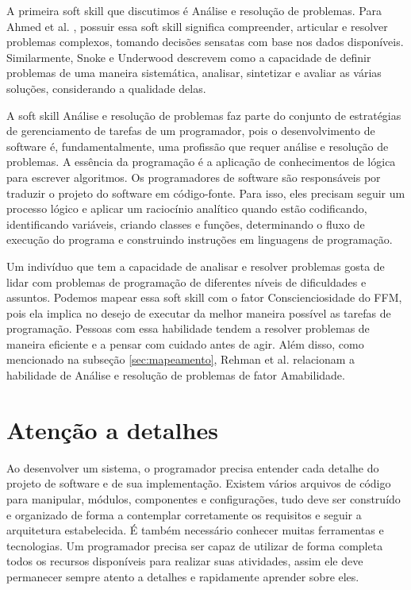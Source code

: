 A primeira soft skill que discutimos é Análise e resolução de problemas. Para Ahmed et al. \cite{ahmed:12}, possuir essa soft skill significa compreender, articular e resolver problemas complexos, tomando decisões sensatas com base nos dados disponíveis. Similarmente, Snoke e Underwood \cite{snoke:01} descrevem como a capacidade de definir problemas de uma maneira sistemática, analisar, sintetizar e avaliar as várias soluções, considerando a qualidade delas.

A soft skill Análise e resolução de problemas faz parte do conjunto de estratégias de gerenciamento de tarefas de um programador, pois o desenvolvimento de software é, fundamentalmente, uma profissão que requer análise e resolução de problemas. A essência da programação é a aplicação de conhecimentos de lógica para escrever algoritmos. Os programadores de software são responsáveis por traduzir o projeto do software em código-fonte. Para isso, eles precisam seguir um processo lógico e aplicar um raciocínio analítico quando estão codificando, identificando variáveis, criando classes e funções, determinando o fluxo de execução do programa e construindo instruções em linguagens de programação. 

Um indivíduo que tem a capacidade de analisar e resolver problemas gosta de lidar com problemas de programação de diferentes níveis de dificuldades e assuntos.
Podemos mapear essa soft skill com o fator Conscienciosidade do FFM, pois ela implica no desejo de executar da melhor maneira possível as tarefas de programação.
Pessoas com essa habilidade tendem a resolver problemas de maneira eficiente e a pensar com cuidado antes de agir.
Além disso, como mencionado na subseção \ref{sec:mapeamento}, Rehman et al. \cite{rehman:12} relacionam a habilidade de Análise e resolução de problemas de fator Amabilidade.

\section{Atenção a detalhes}

Ao desenvolver um sistema, o programador precisa entender cada detalhe do projeto de software e de sua implementação. Existem vários arquivos de código para manipular, módulos, componentes e configurações, tudo deve ser construído e organizado de forma a contemplar corretamente os requisitos e seguir a arquitetura estabelecida. É também necessário conhecer muitas ferramentas e tecnologias. Um programador precisa ser capaz de utilizar de forma completa todos os recursos disponíveis para realizar suas atividades, assim ele deve permanecer sempre atento a detalhes e rapidamente aprender sobre eles.

